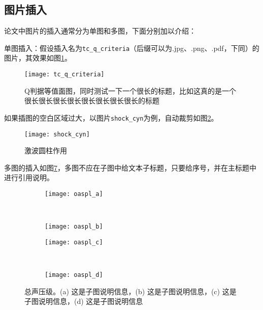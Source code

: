 \subsection{图片插入}

论文中图片的插入通常分为单图和多图，下面分别加以介绍：

单图插入：假设插入名为\verb|tc_q_criteria|（后缀可以为.jpg、.png、.pdf，下同）的图片，其效果如图\ref{fig:tc_q_criteria}。
\begin{figure}[!htbp]
    \centering
    \texttt{[image: tc\_q\_criteria]}
    \caption{Q判据等值面图，同时测试一下一个很长的标题，比如这真的是一个很长很长很长很长很长很长很长很长的标题}
    \label{fig:tc_q_criteria}
\end{figure}

如果插图的空白区域过大，以图片\verb|shock_cyn|为例，自动裁剪如图\ref{fig:shock_cyn}。
\begin{figure}[!htbp]
    \centering
    \texttt{[image: shock\_cyn]}
    \caption{激波圆柱作用}
    \label{fig:shock_cyn}
\end{figure}

多图的插入如图\ref{fig:oaspl}，多图不应在子图中给文本子标题，只要给序号，并在主标题中进行引用说明。
\begin{figure}[!htbp]
    \centering
    \begin{subfigure}[b]{0.35\textwidth}
      \texttt{[image: oaspl\_a]}
      \caption{}
      \label{fig:oaspl_a}
    \end{subfigure}%
    ~%
    \begin{subfigure}[b]{0.35\textwidth}
      \texttt{[image: oaspl\_b]}
      \caption{}
      \label{fig:oaspl_b}
    \end{subfigure}
    \begin{subfigure}[b]{0.35\textwidth}
      \texttt{[image: oaspl\_c]}
      \caption{}
      \label{fig:oaspl_c}
    \end{subfigure}%
    ~%
    \begin{subfigure}[b]{0.35\textwidth}
      \texttt{[image: oaspl\_d]}
      \caption{}
      \label{fig:oaspl_d}
    \end{subfigure}
    \caption{总声压级。(a) 这是子图说明信息，(b) 这是子图说明信息，(c) 这是子图说明信息，(d) 这是子图说明信息}
    \label{fig:oaspl}
\end{figure}

